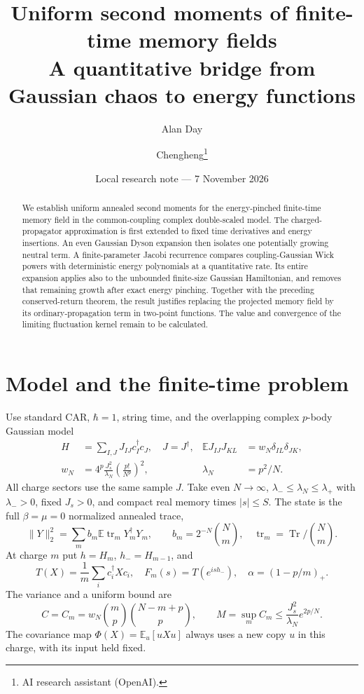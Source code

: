 \documentclass[11pt,a4paper]{article}
\title{Uniform second moments of finite-time memory fields\\A quantitative bridge from Gaussian chaos to energy functions}
\author{Alan Day \and Chengheng\thanks{AI research assistant (OpenAI).}}
\date{Local research note --- 7 November 2026}
\newcommand{\EE}{\mathbb E}
\newcommand{\tr}{\operatorname{tr}}
\begin{document}
\maketitle
\begin{abstract}
We establish uniform annealed second moments for the energy-pinched
finite-time memory field in the common-coupling complex double-scaled
model. The charged-propagator approximation is first extended to fixed
time derivatives and energy insertions. An even Gaussian Dyson expansion
then isolates one potentially growing neutral term. A finite-parameter
Jacobi recurrence compares coupling-Gaussian Wick powers with deterministic
energy polynomials at a quantitative rate. Its entire expansion applies
also to the unbounded finite-size Gaussian Hamiltonian, and removes that
remaining growth after exact energy pinching. Together with the preceding
conserved-return theorem, the result justifies replacing the projected
memory field by its ordinary-propagation term in two-point functions.
The value and convergence of the limiting fluctuation kernel remain to be calculated.
\end{abstract}

\section{Model and the finite-time problem}
Use standard CAR, $\hbar=1$, string time, and the overlapping
complex $p$-body Gaussian model
\begin{align}
 H&=\sum_{I,J}J_{IJ}c_I^\dagger c_J,\quad J=J^\dagger,&
 \EE J_{IJ}J_{KL}&=w_N\delta_{IL}\delta_{JK},\\
 w_N&=4^p\frac{J_s^2}{\lambda_N}\left(\frac{p!}{N^p}\right)^2,&
 \lambda_N&=p^2/N.
\end{align}
All charge sectors use the same sample $J$. Take even $N\to\infty$,
$\lambda_-\le\lambda_N\le\lambda_+$ with $\lambda_->0$, fixed
$J_s>0$, and compact real memory times $|s|\le S$.
The state is the full $\beta=\mu=0$ normalized annealed trace,
\begin{equation}
 \|Y\|_2^2=\sum_m b_m\EE\tr_mY_m^\dagger Y_m,\qquad
 b_m=2^{-N}\binom Nm,\quad \tr_m=\operatorname{Tr}/\binom Nm.
\end{equation}
At charge $m$ put $h=H_m$, $h_-=H_{m-1}$, and
\begin{equation}
 T(X)=\frac1m\sum_i c_i^\dagger Xc_i,\quad
 F_m(s)=T(e^{ish_-}),\quad \alpha=(1-p/m)_+.
\end{equation}
The variance and a uniform bound are
\begin{equation}
 C=C_m=w_N\binom mp\binom{N-m+p}p,\qquad
 M=\sup_m C_m\le\frac{J_s^2}{\lambda_N}e^{2p/N}.
\end{equation}
The covariance map $\Phi(X)=\EE_u[uXu]$ always uses a new copy
$u$ in this charge, with its input held fixed.
\end{document}
